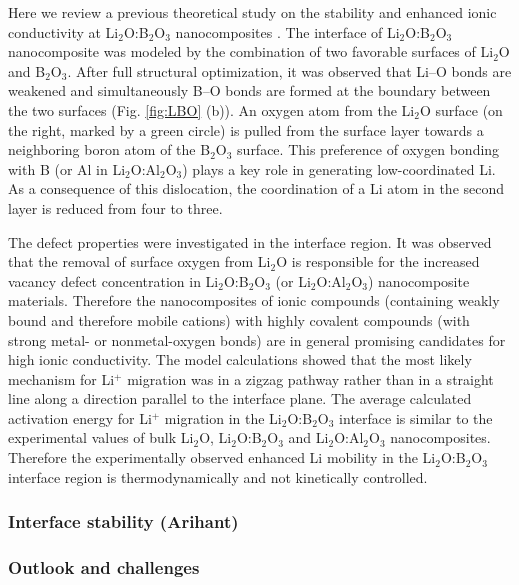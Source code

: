 \documentclass[journal=jacsat,manuscript=article]{achemso}
\begin{document}
Here we review a previous theoretical study on the stability and enhanced ionic conductivity at Li$_2$O:B$_2$O$_3$ nanocomposites \cite{Rana-PRL-2007,Rana-JPCM-2012}. The interface of Li$_2$O:B$_2$O$_3$ nanocomposite was modeled by the combination of two favorable surfaces of Li$_2$O and B$_2$O$_3$. After full structural optimization, it was observed that Li--O bonds are weakened and simultaneously B--O bonds are formed at the boundary between the two surfaces (Fig. \ref{fig:LBO} (b)). An oxygen atom from the Li$_2$O surface (on the right, marked by a green circle) is pulled from the surface layer towards a neighboring boron atom of the B$_2$O$_3$ surface. This preference of oxygen bonding with B (or Al in Li$_2$O:Al$_2$O$_3$) plays a key role in generating low-coordinated Li. As a consequence of this dislocation, the coordination of a Li atom in the second layer is reduced from four to three. 

The defect properties were investigated in the interface region. It was observed that the removal of surface oxygen from Li$_2$O is responsible for the increased vacancy defect concentration in Li$_2$O:B$_2$O$_3$ (or Li$_2$O:Al$_2$O$_3$) nanocomposite materials. Therefore the nanocomposites of ionic compounds (containing weakly bound and therefore mobile cations) with highly covalent compounds (with strong metal- or nonmetal-oxygen bonds) are in general promising candidates for high ionic conductivity. The model calculations showed that the most likely mechanism for Li$^+$ migration was in a zigzag pathway rather than in a straight line along a direction parallel to the interface plane. The average calculated activation energy for Li$^+$ migration in the Li$_2$O:B$_2$O$_3$ interface is similar to the experimental values of bulk Li$_2$O, Li$_2$O:B$_2$O$_3$ and Li$_2$O:Al$_2$O$_3$ nanocomposites. Therefore the experimentally observed enhanced Li mobility in the Li$_2$O:B$_2$O$_3$ interface region is thermodynamically and not kinetically controlled.


\subsubsection{Interface stability (Arihant)}

\subsubsection{Outlook and challenges}
\end{document}
